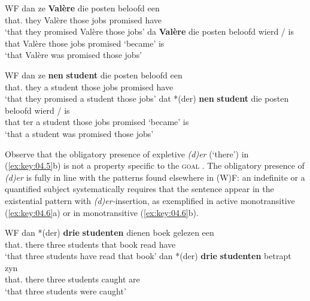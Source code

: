 \documentclass[output=paper]{langsci/langscibook}
\begin{document}
\ea\label{ex:key:04.4}\glsdesc{WF}
    \ea
    \gll dan   ze   \textbf{Valère}   die posten   beloofd   een\\
        that.\Pl{} they   Valère     those jobs   promised   have\\
    \glt ‘that they promised Valère those jobs’
    \ex
    \gll da   \textbf{Valère}   die posten   beloofd   wierd / is\\
        that   Valère     those jobs   promised   ‘became’ {} is\\
    \glt ‘that Valère was promised those jobs’
    \z
\z

\ea\label{ex:key:04.5}\glsdesc{WF}
    \ea
    \gll dan   ze   \textbf{nen} \textbf{student}  die posten   beloofd   een\\
        that.\Pl{} they   a student   those jobs   promised   have\\
    \glt ‘that they promised a student those jobs’
    \ex
    \gll dat   *(der)   \textbf{nen} \textbf{student}   die posten   beloofd   wierd / is\\
    that   \hphantom{*(}ter   a student   those jobs   promised   ‘became’ {} is\\
    \glt ‘that a student was promised those jobs’
    \z
\z

Observe that the obligatory presence of expletive \emph{(d)er} (‘there’) in
(\ref{ex:key:04.5}b) is not a property specific to the \textsc{goal} . The
obligatory presence of \emph{(d)er} is fully in line with the patterns found
elsewhere in (W)F: an indefinite or a quantified subject systematically
requires that the sentence appear in the existential pattern with
\emph{(d)er-}insertion, as exemplified in active monotransitive (\ref{ex:key:04.6}a)
or in  monotransitive (\ref{ex:key:04.6}b).

\ea\label{ex:key:04.6} \glsdesc{WF}
    \ea
\gll   dan   *(der)     \textbf{drie} \textbf{studenten}   dienen boek   gelezen   een\\
		    that.\Pl{} \hphantom{*(}there   three   students   that book   read     have\\
	\glt     ‘that three students have read that book’
    \ex
\gll   dan   *(der)     \textbf{drie} \textbf{studenten}   betrapt     zyn\\
		    that.\Pl{} \hphantom{*(}there   three   students   caught     are\\
	\glt     ‘that three students were caught’
    \z
\z
\end{document}
